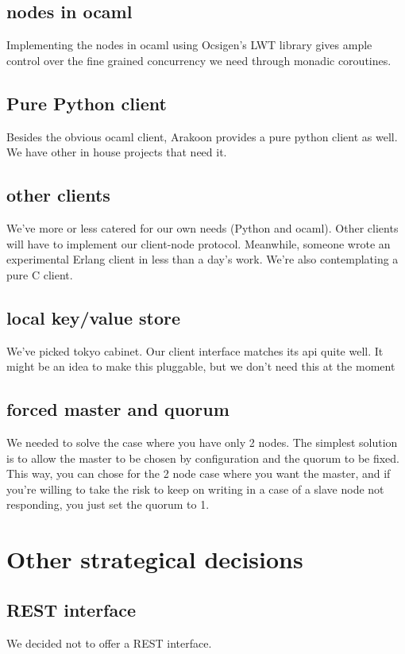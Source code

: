 \subsection{nodes in ocaml}
Implementing the nodes in ocaml using Ocsigen's LWT library gives ample control over the fine grained concurrency we need through monadic coroutines.
\subsection{Pure Python client}
Besides the obvious ocaml client, Arakoon provides a pure python client as well. We have other in house projects that need it.

\subsection{other clients}
We've more or less catered for our own needs (Python and ocaml).
Other clients will have to implement our client-node protocol. 
Meanwhile, someone wrote an experimental Erlang client in less than a day's work. We're also contemplating a pure C client.

\subsection{local key/value store}
We've picked tokyo cabinet. 
Our client interface matches its api quite well. 
It might be an idea to make this pluggable, but we don't need this at the moment

\subsection{forced master and quorum}
We needed to solve the case where you have only 2 nodes.
The simplest solution is to allow the master to be chosen by configuration and the quorum to be fixed. 
This way, you can chose for the 2 node case where you want the master, 
and if you're willing to take the risk to keep on writing in a case of a slave node not responding, you just set the quorum to 1.

\section{Other strategical decisions}
\subsection{REST interface}
We decided not to offer a REST interface.
